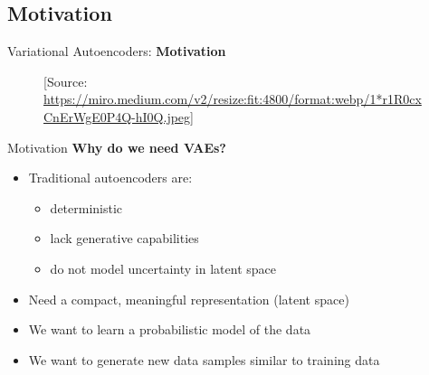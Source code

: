\subsection{Motivation}
\begin{frame}{}
    \LARGE Variational Autoencoders: \textbf{Motivation}
\end{frame}

\begin{frame}{}
    \begin{figure}
        \centering
        \caption*{[Source: \url{https://miro.medium.com/v2/resize:fit:4800/format:webp/1*r1R0cxCnErWgE0P4Q-hI0Q.jpeg}]}
    \end{figure}
\end{frame}

\begin{frame}{Motivation}
    \textbf{Why do we need VAEs?}
    \begin{itemize}
        \item Traditional autoencoders are:
        \begin{itemize}
            \item deterministic
            \item lack generative capabilities
            \item do not model uncertainty in latent space
        \end{itemize}
        \item Need a compact, meaningful representation (latent space)
        \item We want to learn a probabilistic model of the data
        \item We want to generate new data samples similar to training data
    \end{itemize}
\end{frame}
